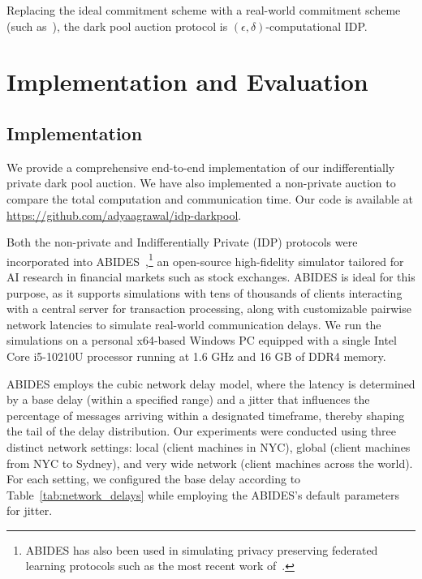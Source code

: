 
\begin{corollary}
Replacing the ideal commitment scheme with a real-world commitment
scheme (such as~\cite{DBLP:journals/jacm/LinP15}),
the dark pool auction protocol is $(\epsilon, \delta)$-computational IDP.
\end{corollary}

\section{Implementation and Evaluation}


\subsection{Implementation}
We provide a comprehensive end-to-end implementation of our indifferentially private dark pool auction. We have also implemented a non-private auction to compare the total computation and communication time. Our code is available at \url{https://github.com/adyaagrawal/idp-darkpool}. 

Both the non-private and Indifferentially Private (IDP) protocols were incorporated into ABIDES~\cite{ByrdHB20},\footnote{ABIDES has also been used in simulating privacy preserving federated learning protocols such as the most recent work of~\cite{MaWAPR23}.} an open-source high-fidelity simulator tailored for AI research in financial markets such as stock exchanges. ABIDES is ideal for this purpose, as it supports simulations with tens of thousands of clients interacting with a central server for transaction processing, along with customizable pairwise network latencies to simulate real-world communication delays. We run the simulations on a personal x64-based Windows PC equipped with a single Intel Core i5-10210U processor running at 1.6 GHz and 16 GB of DDR4 memory. 

ABIDES employs the cubic network delay model, where the latency is determined by a base delay (within a specified range) and a jitter that influences the percentage of messages arriving within a designated timeframe, thereby shaping the tail of the delay distribution. Our experiments were conducted using three distinct network settings: local (client machines in NYC), global (client machines from NYC to Sydney), and very wide network (client machines across the world). For each setting, we configured the base delay according to Table~\ref{tab:network_delays} while employing the ABIDES's default parameters for jitter.


